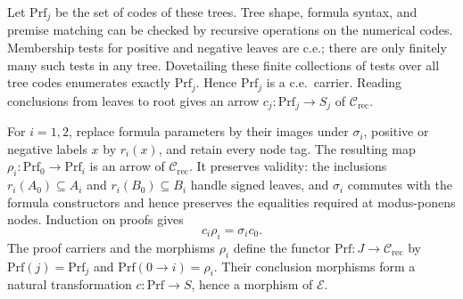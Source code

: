 \documentclass[11pt]{article}
\begin{document}
Let $\mathrm{Prf}_j$ be the set of codes of these trees.
Tree shape, formula syntax, and premise matching can be checked
by recursive operations on the numerical codes. Membership tests
for positive and negative leaves are c.e.; there are only finitely
many such tests in any tree. Dovetailing these finite collections
of tests over all tree codes enumerates exactly $\mathrm{Prf}_j$.
Hence $\mathrm{Prf}_j$ is a c.e.\ carrier.
Reading conclusions from leaves to root gives an arrow
$c_j:\mathrm{Prf}_j\to S_j$ of $\mathcal C_{\mathrm{rec}}$.

For $i=1,2$, replace formula parameters by their images under
$\sigma_i$, positive or negative labels $x$ by $r_i(x)$, and
retain every node tag. The resulting map
$\rho_i:\mathrm{Prf}_0\to\mathrm{Prf}_i$ is an arrow of
$\mathcal C_{\mathrm{rec}}$.
It preserves validity: the inclusions $r_i(A_0)\subseteq A_i$
and $r_i(B_0)\subseteq B_i$ handle signed leaves, and
$\sigma_i$ commutes with the formula constructors and hence
preserves the equalities required at modus-ponens nodes.
Induction on proofs gives
\[
 c_i\rho_i=\sigma_i c_0.
\]
The proof carriers and the morphisms $\rho_i$ define the functor
$\mathrm{Prf}:J\to\mathcal C_{\mathrm{rec}}$ by
$\mathrm{Prf}(j)=\mathrm{Prf}_j$ and
$\mathrm{Prf}(0\to i)=\rho_i$. Their conclusion morphisms form a
natural transformation $c:\mathrm{Prf}\to S$, hence a morphism of
$\mathcal E$.
\end{document}
